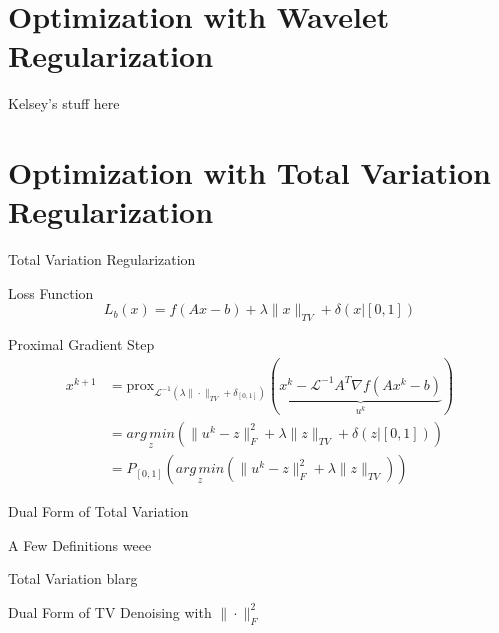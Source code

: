 \documentclass[12pt]{beamer}
\newcommand{\AMz}{\underset{z}{arg\, min}}
\newcommand{\prox}{\text{prox}}
\begin{document}
\section{Optimization with Wavelet Regularization}

\begin{frame}{Kelsey's stuff here}

\end{frame}

\section{Optimization with Total Variation Regularization}

\begin{frame}{Total Variation Regularization}

\begin{exampleblock}{Loss Function}
$$
L_b(x) = f(Ax-b) + \lambda \|x\|_{TV} + \delta(x | [0,1])
$$
\end{exampleblock}

\begin{exampleblock}{Proximal Gradient Step}
\begin{align*}
x^{k+1} &= \prox_{\mathcal{L}^{-1}(\lambda \|\cdot \|_{TV} + \delta_{[0,1]})} (\underbrace{x^k - \mathcal{L}^{-1} A^T\nabla f (Ax^k - b)}_{u^k}) \\
&= \AMz \left( \|u^k - z\|_F^2 + \lambda \|z\|_{TV} + \delta(z | [0,1]) \right) \\
&= P_{[0,1]}  \left( \AMz \left( \|u^k - z\|_F^2 + \lambda \|z\|_{TV} \right) \right)
\end{align*}
\end{exampleblock}

\end{frame}

\begin{frame}{Dual Form of Total Variation}

\begin{exampleblock}{A Few Definitions}
weee
\end{exampleblock}

\begin{exampleblock}{Total Variation}
blarg
\end{exampleblock}

\end{frame}

\begin{frame}{Dual Form of TV Denoising with $\|\cdot \|_F^2$}

\end{frame}
\end{document}
